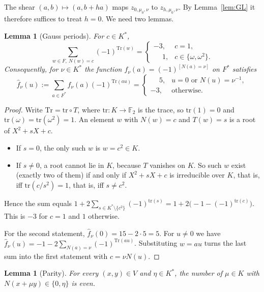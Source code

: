 \documentclass[11pt]{amsart}
\newtheorem{lemma}[theorem]{Lemma}
\theoremstyle{definition}
\newcommand{\F}{\mathbb{F}}
\newcommand{\Tr}{\mathrm{Tr}}
\begin{document}
The shear $(a,b)\mapsto(a,b+ha)$ maps $z_{0,\mu_0,\nu}$ to $z_{h,\mu_0,\nu}$. By Lemma~\ref{lem:GL} it therefore suffices to treat $h=0$. We need two lemmas.

\begin{lemma}[Gauss periods]\label{lem:gauss}
For $c\in K^*$,
\[
\sum_{w\in F,\ N(w)=c}(-1)^{\Tr(w)}=\begin{cases}-3,&c=1,\\ \phantom{-}1,&c\in\{\omega,\omega^2\}.\end{cases}
\]
Consequently, for $\nu\in K^*$ the function $f_\nu(a)=(-1)^{[N(a)=\nu]}$ on $F^*$ satisfies
\[
\hat f_\nu(u):=\sum_{a\in F^*}f_\nu(a)(-1)^{\Tr(au)}=\begin{cases}\phantom{-}5,& u=0\text{ or }N(u)=\nu^{-1},\\-3,&\text{otherwise.}\end{cases}
\]
\end{lemma}

\begin{proof}
Write $\Tr=\mathrm{tr}\circ T$, where $\mathrm{tr}\colon K\to\F_2$ is the trace, so $\mathrm{tr}(1)=0$ and $\mathrm{tr}(\omega)=\mathrm{tr}(\omega^2)=1$. An element $w$ with $N(w)=c$ and $T(w)=s$ is a root of $X^2+sX+c$.
\begin{itemize}
\item If $s=0$, the only such $w$ is $w=c^2\in K$.
\item If $s\neq0$, a root cannot lie in $K$, because $T$ vanishes on $K$. So such $w$ exist (exactly two of them) if and only if $X^2+sX+c$ is irreducible over $K$, that is, iff $\mathrm{tr}(c/s^2)=1$, that is, iff $s\ne c^2$.
\end{itemize}
Hence the sum equals $1+2\sum_{s\in K^*\setminus\{c^2\}}(-1)^{\mathrm{tr}(s)}=1+2\bigl(-1-(-1)^{\mathrm{tr}(c)}\bigr)$. This is $-3$ for $c=1$ and $1$ otherwise.

For the second statement, $\hat f_\nu(0)=15-2\cdot5=5$. For $u\ne0$ we have $\hat f_\nu(u)=-1-2\sum_{N(a)=\nu}(-1)^{\Tr(au)}$. Substituting $w=au$ turns the last sum into the first statement with $c=\nu N(u)$.
\end{proof}

\begin{lemma}[Parity]\label{lem:parity}
For every $(x,y)\in V$ and $\eta\in K^*$, the number of $\mu\in K$ with $N(x+\mu y)\in\{0,\eta\}$ is even.
\end{lemma}
\end{document}
